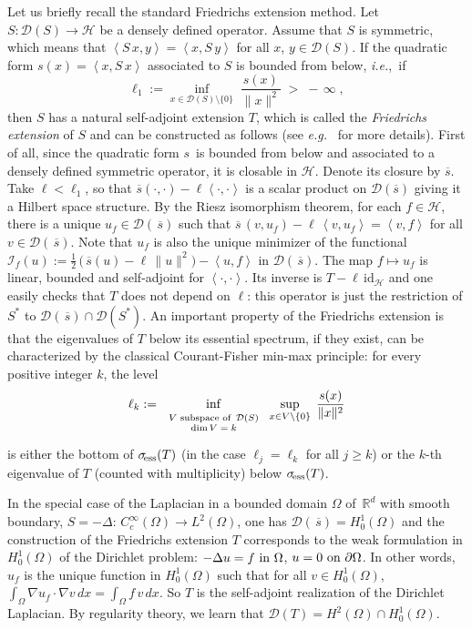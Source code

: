 \documentclass[12pt,reqno]{amsart}
\newcommand{\innerproduct}[2]{\left\langle #1, #2 \right\rangle}
\newcommand{\R}{{\mathbb R}}
\renewcommand{\(}{\left(}
\renewcommand{\)}{\right)}
\begin{document}
Let us briefly recall the standard Friedrichs extension method. Let $S:\mathcal D(S)\to \mathcal H$ be a densely defined operator. Assume that $S$ is symmetric, which means that $\innerproduct{S\,x}{y}= \innerproduct{x}{S\,y}$ for all $x$, $y\in \mathcal D(S)$. If the quadratic form $s(x)=\innerproduct{x}{S\,x}$ associated to $S$ is bounded from below, {\it i.e.},~if
\[
\ell_1:=\inf_{x\in \mathcal D(S)\setminus\{0\}}\; \frac{s(x)}{\|x\|^2} \;>\;-\,\infty\;,
\]
then $S$ has a natural self-adjoint extension $T$, which is called the {\it Friedrichs extension} of $S$ and can be constructed as follows (see {\it e.g.}~\cite{MR0493420} for more details). First of all, since the quadratic form $s\,$ is bounded from below and associated to a densely defined symmetric operator, it is closable in $\mathcal H$. Denote its closure by $\overline{s}$. Take \hbox{$\ell<\ell_1$}, so that  $\overline{s}(\cdot,\cdot)-\ell\innerproduct{\cdot}{\cdot}$ is a scalar product on $\mathcal D(\overline{s})$ giving it a Hilbert space structure. By the Riesz isomorphism theorem, for each $f\in \mathcal H$, there is a unique $u_f\in\mathcal D(\,\overline{s})$ such that $\overline{s}\,(v,u_f)-\ell\,\innerproduct{v}{u_f}=\innerproduct{v}{f}$ for all $v\in \mathcal D(\,\overline{s})$. Note that $u_f$ is also the unique minimizer of the functional $\mathcal I_f(u):=\frac12\,\big(\,\overline{s}(u)-\ell\,\|u\|^2\big)-\innerproduct{u}{f}$ in $\mathcal D(\,\overline{s})$. The map $f\mapsto u_f$ is linear, bounded and self-adjoint for $\innerproduct{\cdot}{\cdot}$. Its inverse is $T-\ell\,\mathrm{id}_{\mathcal H}$ and one easily checks that $T$ does not depend on $\ell$: this operator is just the restriction of $S^*$ to $\mathcal D(\,\overline{s})\cap \mathcal D(S^*)$. An important property of the Friedrichs extension is that the eigenvalues of $T$ below its essential spectrum, if they exist, can be characterized by the classical Courant-Fisher min-max principle: for every positive integer $k$, the level
\[\ell_k:=\,\inf_{\scriptstyle\begin{array}{c}\mbox{\scriptsize $V$ subspace of $\,\mathcal D(S)$}\\[-4pt] \mbox{\scriptsize dim$\,V=k$}\end{array}}\,\sup_{x\in V\setminus\{0\}}\;\frac{s(x)}{\|x\|^2}\]
is either the bottom of $\sigma_{\!\rm  ess}(T)$ (in the case $\ell_j=\ell_k$ for all $j\geq k$) or the $k$-th eigenvalue of $T$ (counted with multiplicity) below $\sigma_{\!\rm ess}(T)$.

In the special case of the Laplacian in a bounded domain $\Omega$ of~$\R^d$ with smooth boundary, $S=-\Delta:\, C^\infty_c(\Omega)\to L^2(\Omega)$, one has $\mathcal D(\,\overline{s})=H^1_0(\Omega)$ and the construction of the Friedrichs extension $T$ corresponds to the weak formulation in $H^1_0(\Omega)$ of the Dirichlet problem: $-\Delta u = f \hbox{ in }\Omega$, $u=0 \hbox{ on }\partial \Omega$. In other words, $u_f$ is the unique function in $H^1_0(\Omega)$ such that for all $v\in H^1_0(\Omega)$, $\int_\Omega \nabla u_f\cdot\nabla v\,dx=\int_\Omega f\,v\,dx$. So $T$ is the self-adjoint realization of the Dirichlet Laplacian. By regularity theory, we learn that $\mathcal D(T)=H^2(\Omega)\cap H^1_0(\Omega)$.
\end{document}
